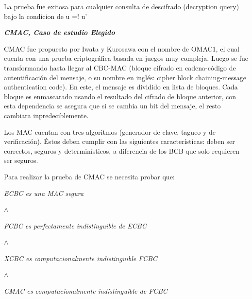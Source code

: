 \documentclass[runningheads,a4paper]{llncs}
\begin{document}
La prueba fue exitosa para cualquier consulta de descifrado (decryption query) bajo la condicion de u =! u'\cite{article3}

\centerline{\textbf{{\emph{CMAC, Caso de estudio Elegido}}}}
CMAC fue propuesto por Iwata y Kurosawa con el nombre de OMAC1, el cual cuenta con una prueba criptográfica basada en juegos muy compleja. Luego se fue transformando hasta llegar al CBC-MAC (bloque cifrado en cadena-código de autentificación del mensaje, o su nombre en inglés: cipher block chaining-message authentication code). En este, el mensaje es dividido en lista de bloques. Cada bloque es enmascarado usando el resultado del cifrado de bloque anterior, con esta dependencia se asegura que si se cambia un bit  del mensaje, el resto cambiara inpredeciblemente.

Los MAC cuentan con tres algoritmos (generador de clave, tagueo y de verificación). Éstos deben cumplir con las siguientes características: deben ser correctos, seguros y determinísticos, a diferencia de los BCB que solo requieren ser seguros.

Para realizar la prueba de CMAC se necesita probar que:

\centerline{\emph{ECBC es una MAC segura}}
\centerline{$\land$}
\centerline{\emph{FCBC es perfectamente indistinguible de ECBC}}
\centerline{$\land$}
\centerline{\emph{XCBC es computacionalmente indistinguible FCBC}}
\centerline{$\land$}
\centerline{\emph{CMAC es computacionalmente indistinguible de FCBC}}
\end{document}
